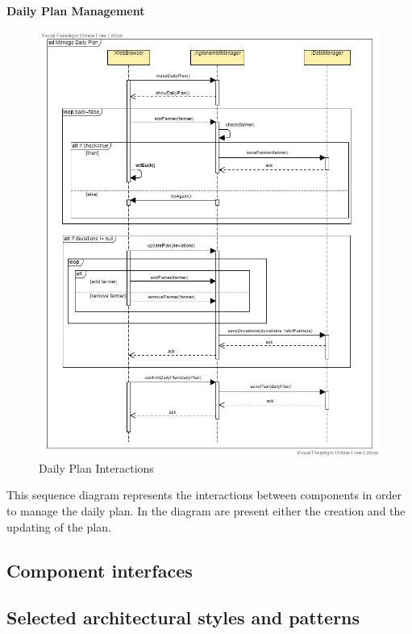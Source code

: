 \documentclass[table, 12pt]{article}
\begin{document}
\newpage
\textbf{Daily Plan Management}
\begin{center}
    \begin{figure}[H]
        \includegraphics[scale=0.47, center]{assets/SequenceDiagram/DailyPlan.jpg}
        \caption{Daily Plan Interactions}
        \label{fig: dailyPlan}
    \end{figure}
\end{center}
This sequence diagram represents the interactions between components in order to manage the daily plan.
In the diagram are present either the creation and the updating of the plan.





\subsection{Component interfaces}

\subsection{Selected architectural styles and patterns}
\end{document}
